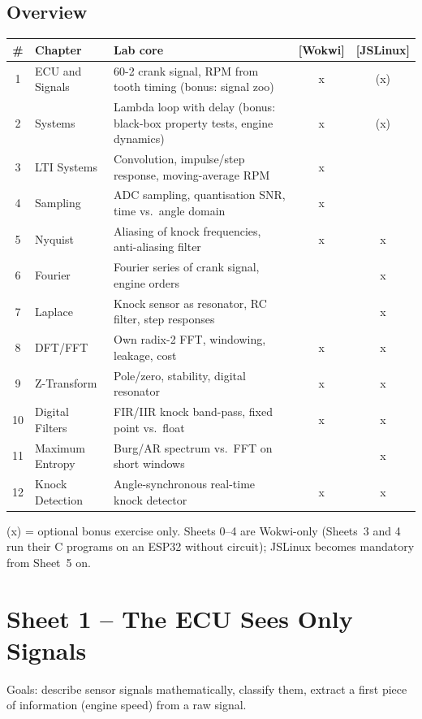 \documentclass[11pt,a4paper]{article}
\newcommand{\W}{\textsf{\textbf{[Wokwi]}}}
\newcommand{\J}{\textsf{\textbf{[JSLinux]}}}
\begin{document}
\subsection*{Overview}
\begin{center}
\small
\begin{tabularx}{\textwidth}{@{}clXcc@{}}
\toprule
\# & Chapter & Lab core & \W & \J\\
\midrule
1 & ECU and Signals & 60-2 crank signal, RPM from tooth timing (bonus: signal zoo) & x & (x)\\
2 & Systems & Lambda loop with delay (bonus: black-box property tests, engine dynamics) & x & (x)\\
3 & LTI Systems & Convolution, impulse/step response, moving-average RPM & x & \\
4 & Sampling & ADC sampling, quantisation SNR, time vs.\ angle domain & x & \\
5 & Nyquist & Aliasing of knock frequencies, anti-aliasing filter & x & x\\
6 & Fourier & Fourier series of crank signal, engine orders & & x\\
7 & Laplace & Knock sensor as resonator, RC filter, step responses & & x\\
8 & DFT/FFT & Own radix-2 FFT, windowing, leakage, cost & x & x\\
9 & Z-Transform & Pole/zero, stability, digital resonator & x & x\\
10 & Digital Filters & FIR/IIR knock band-pass, fixed point vs.\ float & x & x\\
11 & Maximum Entropy & Burg/AR spectrum vs.\ FFT on short windows & & x\\
12 & Knock Detection & Angle-synchronous real-time knock detector & x & x\\
\bottomrule
\end{tabularx}
\end{center}
(x) = optional bonus exercise only. Sheets 0--4 are
Wokwi-only (Sheets~3 and 4 run their C programs on an ESP32 without circuit);
JSLinux becomes mandatory from Sheet~5 on.

\section{Sheet 1 -- The ECU Sees Only Signals}
\begin{sheetinfo}
Goals: describe sensor signals mathematically, classify them, extract a
first piece of information (engine speed) from a raw signal.
\end{sheetinfo}
\end{document}

